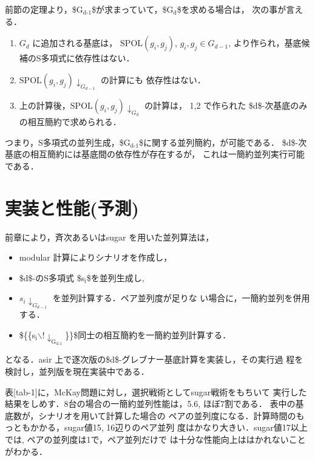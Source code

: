 \documentclass[a4j,12pt]{jarticle}
\begin{document}
{{前節の定理より，\$G\(_{\text{d-1}}\)\$が求まっていて，\$G\(_{\text{d}}\)\$を求める場合は，
次の事が言える．

\begin{enumerate}
\item \(G_d\) に追加される基底は， \({\mathrm{SPOL}}(g_i, g_j)\),
\(g_i, g_j \in G_{d-1}\), より作られ，基底候補のS多項式に依存性はない．

\item \({{{\mathrm{SPOL}}(g_i, g_j)\!\downarrow_{G_{d-1}}}}\) の計算にも
依存性はない．

\item 上の計算後，\({{{\mathrm{SPOL}}(g_i, g_j)\!\downarrow_{G_{d}}}}\)
の計算は， 1,2 で作られた \$d\$-次基底のみの相互簡約で求められる．
\end{enumerate}

つまり，S多項式の並列生成，\$G\(_{\text{d-1}}\)\$に関する並列簡約，が可能である．
\$d\$-次基底の相互簡約には基底間の依存性が存在するが，
これは一簡約並列実行可能である．

\section{実装と性能(予測)}
\label{sec:org08bd3e6}

前章により，斉次あるいはsugar を用いた並列算法は，

\begin{itemize}
\item modular 計算によりシナリオを作成し，

\item \$d\$-のS多項式 \$s\(_{\text{i}}\)\$を並列生成し,

\item \({{s_i\!\downarrow_{G_{d-1}}}}\) を並列計算する．ペア並列度が足りな
い場合に，一簡約並列を併用する．

\item \$\{\{s\(_{\text{i}}\)$\backslash$!\(\downarrow_{\text{G}_{\text{d-1}}}\)\}\}\$同士の相互簡約を一簡約並列計算する．
\end{itemize}

となる．asir 上で逐次版の\$d\$-グレブナー基底計算を実装し，その実行過
程を検討し，並列版を現在実装中である．

表[tab-1]に，McKay\cite{noro97-mckay}問題に対し，選択戦術としてsugar戦術をもちいて
実行した結果をしめす．8台の場合の一簡約並列性能は，5.6, ほぼ7割である．
表中の基底数が，シナリオを用いて計算した場合の
ペアの並列度になる．計算時間のもっともかかる，sugar値15,
16辺りのペア並列 度はかなり大きい．sugar値17以上では,
ペアの並列度は1で，ペア並列だけで
は十分な性能向上ははかれないことがわかる．

}}
\end{document}
